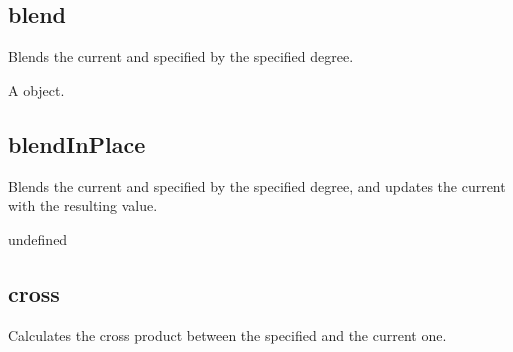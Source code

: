 \documentclass[letterpaper,12pt,english,openany,oneside]{sphinxmanual}
\begin{document}
\subsection{blend}
\label{\detokenize{JS_3D_API:blend}}
Blends the current and specified  by the specified degree.

\label{\detokenize{JS_3D_API:syntax-133}}

\begin{sphinxVerbatim}[commandchars=\\\{\}]
 
\end{sphinxVerbatim}
\label{\detokenize{JS_3D_API:parameters-95}}

\label{\detokenize{JS_3D_API:section-133}}\label{\detokenize{JS_3D_API:returns-134}}

A  object.


\subsection{blendInPlace}
\label{\detokenize{JS_3D_API:blendinplace}}
Blends the current and specified  by the specified degree, and updates the current  with the resulting value.

\label{\detokenize{JS_3D_API:syntax-134}}

\begin{sphinxVerbatim}[commandchars=\\\{\}]
 
\end{sphinxVerbatim}
\label{\detokenize{JS_3D_API:parameters-96}}

\label{\detokenize{JS_3D_API:section-134}}\label{\detokenize{JS_3D_API:returns-135}}

undefined


\subsection{cross}
\label{\detokenize{JS_3D_API:cross}}
Calculates the cross product between the specified  and the current one.
\end{document}
